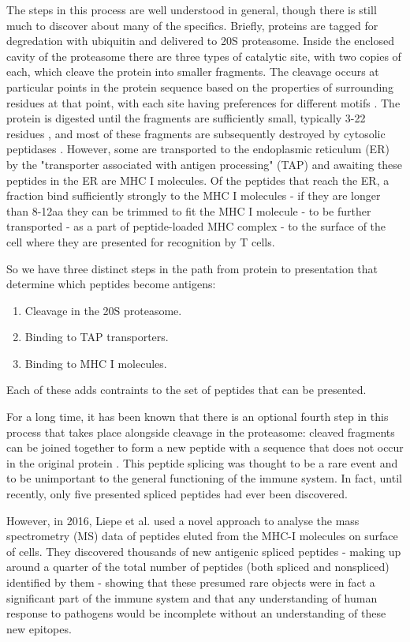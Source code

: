 \documentclass[10pt,a4paper,twoside,twocolumn]{article}
\begin{document}
The steps in this process are well understood in general, though there is still much to discover about many of the specifics. Briefly, proteins are tagged for degredation with ubiquitin and delivered to 20S proteasome. Inside the enclosed cavity of the proteasome there are three types of catalytic site, with two copies of each, which cleave the protein into smaller fragments. The cleavage occurs at particular points in the protein sequence based on the properties of surrounding residues at that point, with each site having preferences for different motifs \cite{Nussbaum1998}. The protein is digested until the fragments are sufficiently small, typically 3-22 residues \cite{Kisselev1999}, and  most of these fragments are subsequently destroyed by cytosolic peptidases \cite{Reits2003}. However, some are transported to the endoplasmic reticulum (ER) by the "transporter associated with antigen processing" (TAP) and awaiting these peptides in the ER are MHC I molecules. Of the peptides that reach the ER, a fraction bind sufficiently strongly to the MHC I molecules - if they are longer than 8-12aa they can be trimmed to fit the MHC I molecule - to be further transported - as a part of peptide-loaded MHC complex - to the surface of the cell where they are presented for recognition by T cells.

So we have three distinct steps in the path from protein to presentation that determine which peptides become antigens:
\begin{enumerate}
	\item Cleavage in the 20S proteasome.
	\item Binding to TAP transporters.
	\item Binding to MHC I molecules.
\end{enumerate}
Each of these adds contraints to the set of peptides that can be presented. 

For a long time, it has been known that there is an optional fourth step in this process that takes place alongside cleavage in the proteasome: cleaved fragments can be joined together to form a new peptide with a sequence that does not occur in the original protein \cite{Hanada2004a}. This peptide splicing was thought to be a rare event and to be unimportant to the general functioning of the immune system. In fact, until recently, only five presented spliced peptides had ever been discovered. 

However, in 2016, Liepe et al. \cite{Liepe2016} used a novel approach to analyse the mass spectrometry (MS) data of peptides eluted from the MHC-I molecules on surface of cells. They discovered thousands of new antigenic spliced peptides - making up around a quarter of the total number of peptides (both spliced and nonspliced) identified by them - showing that these presumed rare objects were in fact a significant part of the immune system and that any understanding of human response to pathogens would be incomplete without an understanding of these new epitopes.
\end{document}
